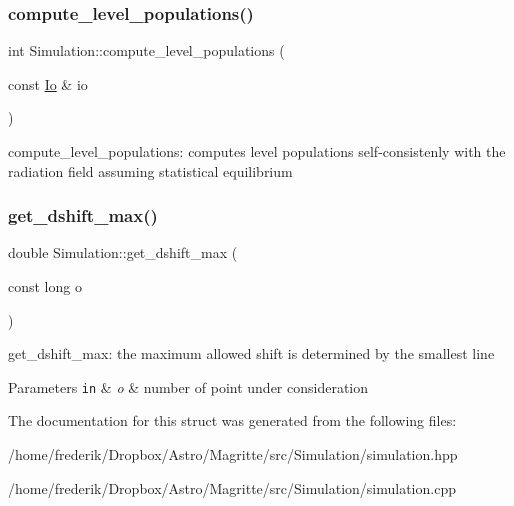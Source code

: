 \subsubsection{\texorpdfstring{compute\+\_\+level\+\_\+populations()}{compute\_level\_populations()}}
{\footnotesize\ttfamily int Simulation\+::compute\+\_\+level\+\_\+populations (\begin{DoxyParamCaption}\item[{const \mbox{\hyperlink{structIo}{Io}} \&}]{io }\end{DoxyParamCaption})}

compute\+\_\+level\+\_\+populations\+: computes level populations self-\/consistenly with the radiation field assuming statistical equilibrium \mbox{\label{structSimulation_a37df96c36c99a3591bb0a7a6f74fa1a1}} 
\subsubsection{\texorpdfstring{get\+\_\+dshift\+\_\+max()}{get\_dshift\_max()}}
{\footnotesize\ttfamily double Simulation\+::get\+\_\+dshift\+\_\+max (\begin{DoxyParamCaption}\item[{const long}]{o }\end{DoxyParamCaption})\hspace{0.3cm}{\ttfamily [inline]}}

get\+\_\+dshift\+\_\+max\+: the maximum allowed shift is determined by the smallest line 
\begin{DoxyParams}[1]{Parameters}
\mbox{\tt in}  & {\em o} & number of point under consideration \\
\hline
\end{DoxyParams}


The documentation for this struct was generated from the following files\+:\begin{DoxyCompactItemize}
\item 
/home/frederik/\+Dropbox/\+Astro/\+Magritte/src/\+Simulation/simulation.\+hpp\item 
/home/frederik/\+Dropbox/\+Astro/\+Magritte/src/\+Simulation/simulation.\+cpp\end{DoxyCompactItemize}
